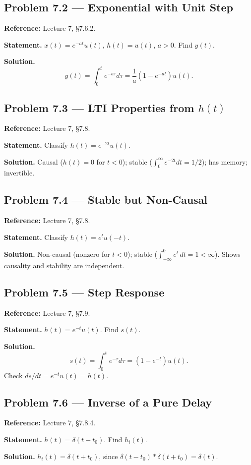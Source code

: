\documentclass[11pt]{article}
\newcommand{\Conv}{\ast}
\begin{document}
\subsection{Problem 7.2 --- Exponential with Unit Step}
\textbf{Reference:} Lecture 7, \S 7.6.2.

\textbf{Statement.} $x(t)=e^{-at}u(t)$, $h(t)=u(t)$, $a>0$. Find $y(t)$.

\textbf{Solution.}
\[
y(t) = \int_0^t e^{-a\tau}d\tau = \frac{1}{a}(1-e^{-at})u(t).
\]

\subsection{Problem 7.3 --- LTI Properties from $h(t)$}
\textbf{Reference:} Lecture 7, \S 7.8.

\textbf{Statement.} Classify $h(t)=e^{-2t}u(t)$.

\textbf{Solution.} Causal ($h(t)=0$ for $t<0$); stable ($\int_0^\infty e^{-2t}dt=1/2$); has memory; invertible.

\subsection{Problem 7.4 --- Stable but Non-Causal}
\textbf{Reference:} Lecture 7, \S 7.8.

\textbf{Statement.} Classify $h(t)=e^{t}u(-t)$.

\textbf{Solution.} Non-causal (nonzero for $t<0$); stable ($\int_{-\infty}^0 e^t\,dt = 1<\infty$). Shows causality and stability are independent.

\subsection{Problem 7.5 --- Step Response}
\textbf{Reference:} Lecture 7, \S 7.9.

\textbf{Statement.} $h(t)=e^{-t}u(t)$. Find $s(t)$.

\textbf{Solution.}
\[
s(t)=\int_0^t e^{-\tau}d\tau = (1-e^{-t})u(t).
\]
Check $ds/dt = e^{-t}u(t) = h(t)$.

\subsection{Problem 7.6 --- Inverse of a Pure Delay}
\textbf{Reference:} Lecture 7, \S 7.8.4.

\textbf{Statement.} $h(t)=\delta(t-t_0)$. Find $h_i(t)$.

\textbf{Solution.} $h_i(t)=\delta(t+t_0)$, since $\delta(t-t_0)\Conv\delta(t+t_0)=\delta(t)$.
\end{document}
